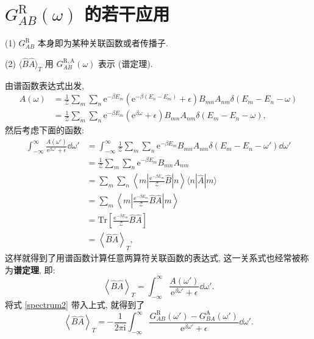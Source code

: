 \section{$G_{AB}^{\mathrm{R}}(\omega)$ 的若干应用}

    (1)  $G_{AB}^{\mathrm{R}}$ 本身即为某种关联函数或者传播子. 
    
    (2)  $\langle \hat{B}\hat{A} \rangle_T$ 用 $G_{AB}^{\mathrm{R,A}}(\omega)$ 表示 (谱定理).
    
    由谱函数表达式出发,
        \begin{align}
            A(\omega)&=\frac{1}{\mathcal{Z}}\sum_m\sum_n\mathrm{e}^{-\beta E_m}\left( \mathrm{e}^{-\beta(E_n-E_m)}+\epsilon \right) B_{mn}A_{nm}\delta(E_m-E_n-\omega)\nonumber\\
            &=\frac{1}{\mathcal{Z}}\sum_m\sum_n\mathrm{e}^{-\beta E_m}\left( \mathrm{e}^{\beta\omega}+\epsilon \right) B_{mn}A_{nm}\delta(E_m-E_n-\omega),
        \end{align}
    然后考虑下面的函数:
 \begin{align}\label{average1}
            \int_{-\infty}^{\infty}\frac{A(\omega')}{\mathrm{e}^{\beta\omega'}+\epsilon}\dd\omega'&=\int_{-\infty}^{\infty}\frac{1}{\mathcal{Z}}\sum_m\sum_n\mathrm{e}^{-\beta E_m}B_{mn}A_{nm}\delta(E_m-E_n-\omega')\dd\omega'\nonumber\\
            &=\frac{1}{\mathcal{Z}}\sum_m\sum_n\mathrm{e}^{-\beta E_m}B_{mn}A_{nm}\nonumber\\
            &=\sum_m\sum_n\left\langle m \left| \frac{\mathrm{e}^{-\beta E_m}}{\mathcal{Z}}\hat B \right| n \right\rangle \langle n|\hat A |m \rangle\nonumber\\
            &=\sum_m\left\langle m\left| \frac{\mathrm{e}^{-\beta E_m}}{\mathcal{Z}}\hat B\hat A \right|m \right\rangle\nonumber\\
            &=\mathrm{Tr}\left[ \frac{\mathrm{e}^{-\beta E_m}}{\mathcal{Z}}\hat B\hat A \right]\nonumber\\
            &=\left\langle \hat B\hat A \right\rangle_T,
        \end{align}
这样就得到了用谱函数计算任意两算符关联函数的表达式, 这一关系式也经常被称为\textbf{谱定理}, 即:
\begin{equation}\label{eq242}
\boxed{
\left\langle \hat B\hat A \right\rangle_T=\int_{-\infty}^{\infty}\frac{A(\omega')}{\mathrm{e}^{\beta\omega'}+\epsilon}\dd\omega'.
}
\end{equation}
将式 \eqref{spectrum2} 带入上式, 就得到了
    \begin{equation}
        \left\langle \hat{B}\hat{A} \right\rangle_T=-\frac{1}{2\pi\mathrm{i}}\int_{-\infty}^{\infty}\frac{G_{AB}^{\mathrm{R}}(\omega')-G_{BA}^{\mathrm{A}}(\omega')}{\mathrm{e}^{\beta\omega'}+\epsilon}\dd\omega'.
    \end{equation}

